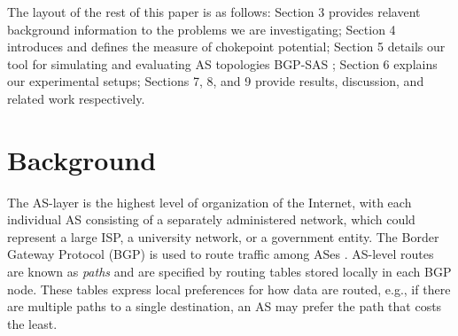 \documentclass[10pt, conference, letterpaper]{IEEEtran}
\newcommand{\toolname}{BGP-SAS }
\begin{document}
\par
The layout of the rest of this paper is as follows: Section 3 provides relavent background information
to the problems we are investigating; Section 4 introduces and defines the measure of chokepoint
potential; Section 5 details our tool for simulating and evaluating AS topologies \toolname; Section 6
explains our experimental setups; Sections 7, 8, and 9 provide results, discussion, and related work
respectively.

\section{Background}

The AS-layer is the highest level of organization of the Internet, with each individual AS consisting of a separately administered network, which could represent a large ISP, a university network, or a government entity. The Border Gateway Protocol (BGP) is used to route traffic among ASes \cite{bgp}.  AS-level routes are known as \emph{paths} and are specified by routing tables stored locally in each BGP node.  These tables express local preferences for how data are routed, e.g., if there are multiple paths to a single destination, an AS may prefer the path that costs the least.
\end{document}
